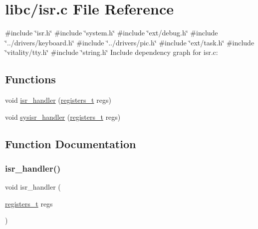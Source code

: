 \hypertarget{a00071}{}\section{libc/isr.c File Reference}
\label{a00071}
{\ttfamily \#include \char`\"{}isr.\+h\char`\"{}}\newline
{\ttfamily \#include \char`\"{}system.\+h\char`\"{}}\newline
{\ttfamily \#include \char`\"{}ext/debug.\+h\char`\"{}}\newline
{\ttfamily \#include \char`\"{}../drivers/keyboard.\+h\char`\"{}}\newline
{\ttfamily \#include \char`\"{}../drivers/pic.\+h\char`\"{}}\newline
{\ttfamily \#include \char`\"{}ext/task.\+h\char`\"{}}\newline
{\ttfamily \#include \char`\"{}vitality/tty.\+h\char`\"{}}\newline
{\ttfamily \#include \char`\"{}string.\+h\char`\"{}}\newline
Include dependency graph for isr.\+c\+:
\subsection*{Functions}
\begin{DoxyCompactItemize}
\item 
void \hyperlink{a00071_a700e3ca056bf69296370f504f2cb6cc8_a700e3ca056bf69296370f504f2cb6cc8}{isr\+\_\+handler} (\hyperlink{a00074_adf58dbaf6139b4957c348711f2026957_adf58dbaf6139b4957c348711f2026957}{registers\+\_\+t} regs)
\item 
void \hyperlink{a00071_abd1fa375737cd5ecd84c082738e3b195_abd1fa375737cd5ecd84c082738e3b195}{sysisr\+\_\+handler} (\hyperlink{a00074_adf58dbaf6139b4957c348711f2026957_adf58dbaf6139b4957c348711f2026957}{registers\+\_\+t} regs)
\end{DoxyCompactItemize}


\subsection{Function Documentation}
\mbox{\label{a00071_a700e3ca056bf69296370f504f2cb6cc8_a700e3ca056bf69296370f504f2cb6cc8}} 
\subsubsection{\texorpdfstring{isr\+\_\+handler()}{isr\_handler()}}
{\footnotesize\ttfamily void isr\+\_\+handler (\begin{DoxyParamCaption}\item[{\hyperlink{a00074_adf58dbaf6139b4957c348711f2026957_adf58dbaf6139b4957c348711f2026957}{registers\+\_\+t}}]{regs }\end{DoxyParamCaption})}




